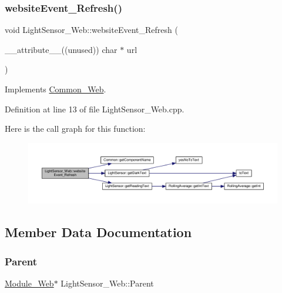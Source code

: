 \subsubsection{\texorpdfstring{website\+Event\+\_\+\+Refresh()}{websiteEvent\_Refresh()}}
{\footnotesize\ttfamily void Light\+Sensor\+\_\+\+Web\+::website\+Event\+\_\+\+Refresh (\begin{DoxyParamCaption}\item[{\+\_\+\+\_\+attribute\+\_\+\+\_\+((unused)) char $\ast$}]{url }\end{DoxyParamCaption})\hspace{0.3cm}{\ttfamily [virtual]}}



Implements \hyperlink{class_common___web_aaca7c54fdcf908e4e1256b7b1f6fc212}{Common\+\_\+\+Web}.



Definition at line 13 of file Light\+Sensor\+\_\+\+Web.\+cpp.

Here is the call graph for this function\+:
\nopagebreak
\begin{figure}[H]
\begin{center}
\leavevmode
\includegraphics[width=350pt]{class_light_sensor___web_a6afe75f4f6cec3dc5f44454e23da1f8a_cgraph}
\end{center}
\end{figure}


\subsection{Member Data Documentation}
\mbox{\label{class_light_sensor___web_a742b224aefe383be1a32ae97b5bb1fcc}} 
\subsubsection{\texorpdfstring{Parent}{Parent}}
{\footnotesize\ttfamily \hyperlink{class_module___web}{Module\+\_\+\+Web}$\ast$ Light\+Sensor\+\_\+\+Web\+::\+Parent\hspace{0.3cm}{\ttfamily [protected]}}




